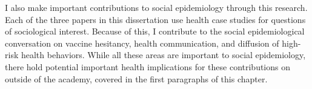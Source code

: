 I also make important contributions to social epidemiology through this
research. Each of the three papers in this dissertation use health case
studies for questions of sociological interest. Because of this, I 
contribute to the social epidemiological conversation on vaccine hesitancy,
health communication, and diffusion of high-risk health behaviors. While
all these areas are important to social epidemiology, there hold
potential important health implications for these contributions on
outside of the academy, covered in the first paragraphs of this chapter.

